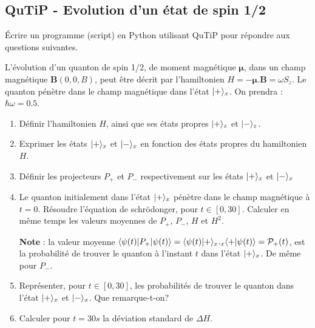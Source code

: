 \subsection{QuTiP - Evolution d'un état de spin 1/2}

Écrire un programme (script) en Python utilisant QuTiP pour répondre aux 
questions suivantes.

L'évolution d'un quanton de spin 1/2, de moment magnétique $\mathbf{\mu}$, dans un champ magnétique $\textbf{B}(0,0,B)$, peut être décrit par l'hamiltonien $H=-\mathbf{\mu}.\textbf{B}=\omega S_z$. Le quanton pénètre dans le champ magnétique dans l'état $\vert+\rangle_x$. On prendra : $\hbar\omega=0.5$.
\begin{enumerate}
\item Définir l'hamiltonien $H$, ainsi que ses états propres $\vert+\rangle_z$ et $\vert-\rangle_z$.
\item Exprimer les états $\vert+\rangle_x$ et $\vert-\rangle_x$ en fonction des états propres du hamiltonien $H$.
\item Définir les projecteurs $P_+$ et $P_-$ respectivement sur les états $\vert+\rangle_x$ et $\vert-\rangle_x$
\item Le quanton initialement dans l'état $\vert+\rangle_x$ pénètre dans le champ magnétique à $t=0$. Résoudre l'équation de schr\"odonger, pour $t\in[0,30]$. Calculer en même temps les valeurs moyennes de $P_+$, $P_-$, $H$ et $H^2$.

\textbf{Note} : la valeur moyenne $\langle\psi(t)\vert P_+\vert\psi(t)\rangle=\langle\psi(t)\vert+\rangle_x ._x\langle+\vert\psi(t)\rangle=\mathcal{P}_+(t)$, est la probabilité de trouver le quanton à l'instant $t$ dans l'état $\vert+\rangle_x$. De même pour $P_-$.
\item Représenter, pour $t\in[0,30]$, les probabilités de trouver le quanton dans l'état $\vert+\rangle_x$ et $\vert-\rangle_x$. Que remarque-t-on?
\item Calculer pour $t=30s$ la déviation standard de $\Delta H$.
\end{enumerate}
